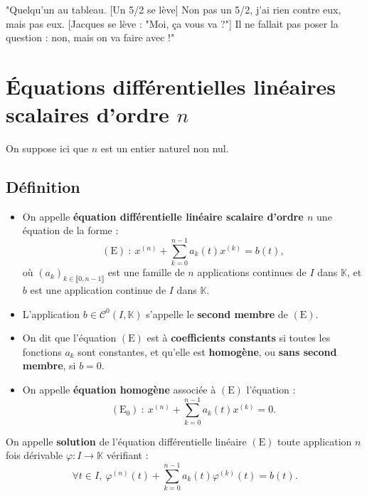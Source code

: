 \documentclass[french]{article}
\newcommand{\K}{\mathbb{K}}
\theoremstyle{plain}
\theoremstyle{definition}
\theoremstyle{remark}
\begin{document}
"Quelqu'un au tableau. [Un 5/2 se lève] Non pas un 5/2, j'ai rien contre eux, mais pas eux. [Jacques se lève : "Moi, ça vous va ?"] Il ne fallait pas poser la question : non, mais on va faire avec !"

\section{Équations différentielles linéaires scalaires d'ordre $n$}

On suppose ici que $n$ est un entier naturel non nul.

\subsection{Définition}

\begin{dfn}
	\begin{itemize}
		\item On appelle \textbf{équation différentielle linéaire scalaire d'ordre $n$} une équation de la forme :
		$$(\text{E})\ :\ x^{(n)}+\sum_{k=0}^{n-1}a_k(t)x^{(k)}=b(t),$$ où $(a_k)_{k\in\llbracket0,n-1\rrbracket}$ est une famille de $n$ applications continues de $I$ dans $\K$, et $b$ est une application continue de $I$ dans $\K$.
		\item L'application $b\in\mathcal{C}^0(I,\K)$ s'appelle le \textbf{second membre} de $(\text{E})$.
		\item On dit que l'équation $(\text{E})$ est à \textbf{coefficients constants} si toutes les fonctions $a_k$ sont constantes, et qu'elle est \textbf{homogène}, ou \textbf{sans second membre}, si $b=0$.
		\item On appelle \textbf{équation homogène} associée à $(\text{E})$ l'équation :
		$$(\text{E}_0)\ :\ x^{(n)}+\sum_{k=0}^{n-1}a_k(t)x^{(k)}=0.$$
	\end{itemize}
\end{dfn}

\begin{dfn}
	On appelle \textbf{solution} de l'équation différentielle linéaire $(\text{E})$ toute application $n$ fois dérivable $\varphi:I\to\K$ vérifiant :
	$$\forall t\in I,\ \varphi^{(n)}(t)+\sum_{k=0}^{n-1}a_k(t)\varphi^{(k)}(t)=b(t).$$
\end{dfn}
\end{document}
